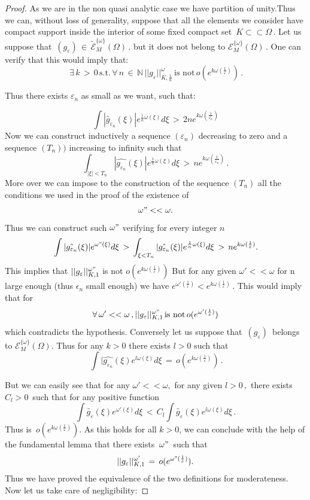 \documentclass[12pt,a4paper]{amsart}
\newcommand{\NN}{\mathbb N}
\begin{document}
  
\begin{proof}
   As we are  in the non quasi analytic case we have partition of unity.Thus  we can, without loss of generality, suppose that   all the elements we consider have compact support inside  the interior of some fixed  compact set
   $\,K\subset\subset \Omega\,.$
   Let us suppose that
    $\,(g_\varepsilon)\,\in\,
    \tilde{\mathcal{E}}^{\{\omega\}}_M (\Omega)\,.$
    but it does not belong to 
    $\mathcal{E}^{\{\omega\}}_M(\Omega)\, .$
 One can verify that this would imply that: 
    $$
\,\exists\,k\,>\,0\,\mbox{s.t.}\,\forall\,n\,\in\,\NN\,
||g_\varepsilon||_{K,\frac{1}{n}}^\omega\,\mbox{is not}\,
o(e^{k\omega(\frac{1}{\varepsilon})})\,.$$

Thus there exists $\varepsilon_n $ as small as we want, such that: 

$$
\int|\hat{g}_{\varepsilon_n}(\xi)|e^{\frac{1}{n}\omega(\xi)}d\xi\,>\,2ne^{k\omega(\frac{1}{\varepsilon_n})}
$$
Now we can construct inductively a sequence
 $(\varepsilon_n)$ decreasing to zero and a sequence 
 $(T_n))$ increasing to infinity such that 
 $$\int_{|\xi|<T_n}|\hat{g_{\varepsilon_n}}(\xi)|e^{\frac{1}{n}\omega(\xi)}d\xi\,
 >\,ne^{k\omega(\frac{1}{\varepsilon_n})}\,.$$
 More over we can impose to the construction of the sequence $(T_n)$ all the conditions we used in the proof of the existence of $$ \omega"<<\omega  .$$
  Thus we can construct  such $\omega"$ verifying for every integer $n$ 
 $$ \,\int|\hat{g_{\varepsilon_n}}(\xi)|e^{\omega"(\xi)}d\xi\,>\,\int_{\xi<T_n}|\hat{g_{\varepsilon_n}}(\xi)|e^{\frac{1}{n}\omega(\xi)}d\xi\,>\,ne^{k\omega(\frac{1}{\varepsilon})}.$$
 This implies that
 $||g_\varepsilon||_{K,1}^{\omega"}$ is not
  $o(e^{k\omega(\frac{1}{\varepsilon})})$
  But for any given  $\omega'<<\omega$
   for n large enough (thus $\epsilon_n$ small enough)
   we have
    $e^{\omega'(\frac{1}{\varepsilon})}  < e^{k\omega(\frac{1}{\varepsilon})}\,.$ 
    This would imply that for  $$\forall \,\omega' <<\omega\,,
    ||g_\varepsilon||_{K,1}^{\omega"}\,\mbox{is not}\,
    o(e^{\omega'(\frac{1}{\varepsilon})})$$ 
    which contradicts the hypothesis.
     Conversely let us suppose that 
     $\,(g_\varepsilon)\,$ belongs to
     $ \mathcal{E}^{\{\omega\}}_M(\Omega) .$
     Thus for any $k>0$ there exists $l>0$ 
      such that 
      $$\,
      \int|\hat{g_{\varepsilon_n}}(\xi)e^{l\omega(\xi)}d\xi\,=\,o(e^{k\omega(\frac{1}{\varepsilon})})\,.$$
     
But we can easily see that for any $\omega ' <<\omega, $
 for any given $l>0\,,$ there exists $C_l>0\,$ such that for any positive function
 $$\int \tilde{g_\varepsilon}(\xi)e^{\omega'(\xi)}d\xi\,
 <\,C_l\int\tilde{g_\varepsilon}(\xi)e^{l\omega(\xi)}d\xi \,.$$ Thus 
 is $\,o(e^{k\omega(\frac{1}{\varepsilon})}).$
 As this holds for all $k>0$,
 we can conclude with the help of the fundamental lemma that there exists $ \,\omega"\,$
 such that 
 $$||g_\varepsilon||_{K,1}^{\omega'}\,
 =\,o(e^{\omega"(\frac{1}{\varepsilon})}).$$
 Thus we have proved the equivalence of the two definitions for moderateness.
  Now let us take care of negligibility:
  

\end{proof}
\end{document}
